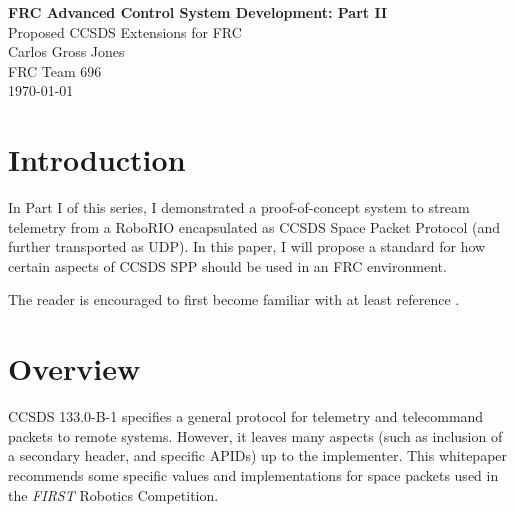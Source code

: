 \documentclass[12pt]{article}
\begin{document}
	\begin{titlepage}
	\begin{center}
		
	
	\vspace*{1in}
	{\Huge \textbf{FRC Advanced Control System Development: Part II}}\\
	\vspace{0.25in}
	{\LARGE Proposed CCSDS Extensions for FRC}\\
	\vspace{0.5in}
	{\Large Carlos Gross Jones}\\
	\vspace{0.1in}
	{\Large FRC Team 696}\\
	\vspace{0.1in}
	{\Large \today}\\
\end{center}
	
\end{titlepage}


\section{Introduction}
\par In Part I of this series, I demonstrated a proof-of-concept system to stream telemetry from a RoboRIO encapsulated as CCSDS Space Packet Protocol (and further transported as UDP). In this paper, I will propose a standard for how certain aspects of CCSDS SPP should be used in an FRC environment. 
\par The reader is encouraged to first become familiar with at least reference \cite{SPP}.

\section{Overview}
\par CCSDS 133.0-B-1 \cite{SPP} specifies a general protocol for telemetry and telecommand packets to remote systems. However, it leaves many aspects (such as inclusion of a secondary header, and specific APIDs) up to the implementer. This whitepaper recommends some specific values and implementations for space packets used in the \textit{FIRST} Robotics Competition. 
\end{document}
